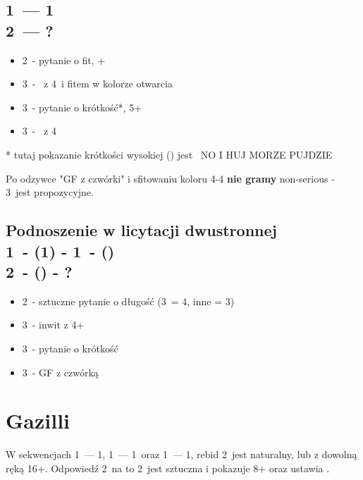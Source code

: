 \documentclass[12pt, a4paper]{article}
\begin{document}
\subsection{1\clubs\ --- 1\spades \\ 2\spades\ --- ?}
\begin{itemize}
    \item 2\nt\ - pytanie o fit, \inv+
    \item 3\clubs\ - \inv\ z 4\spades\ i fitem w kolorze otwarcia
    \item 3\diams\ - pytanie o krótkość*, 5+\spades
    \item 3\hearts\ - \gf\ z 4\spades
\end{itemize}
* tutaj pokazanie krótkości wysokiej (\hearts) jest \gf\ NO I HUJ MORZE PUJDZIE

\begin{formal}
    Po odzywce "GF z czwórki" i sfitowaniu koloru 4-4 \textbf{nie gramy} non-serious - 3\nt\ jest propozycyjne.
\end{formal}

\subsection{Podnoszenie w licytacji dwustronnej \\
            1\clubs\ - (1\hearts) - 1\spades\ - (\passx) \\
            2\spades\ - (\passx) - ?}

\begin{itemize}
    \item 2\nt\ - sztuczne pytanie o długość (3\spades\ = 4, inne = 3)
    \item 3\clubs\ - inwit z 4+\clubs
    \item 3\diams\ - pytanie o krótkość
    \item 3\hearts\ - GF z czwórką
\end{itemize}


\pagebreak
\section{Gazilli}
W sekwencjach 1\hearts\ --- 1\spades, 1\hearts\ --- 1\nt\ oraz 1\spades\ --- 1\nt, rebid 2\clubs\
jest naturalny, lub z dowolną ręką 16+. Odpowiedź 2\diams\ na to 2\clubs\ jest sztuczna i pokazuje 8+ oraz ustawia \gf.
\end{document}
